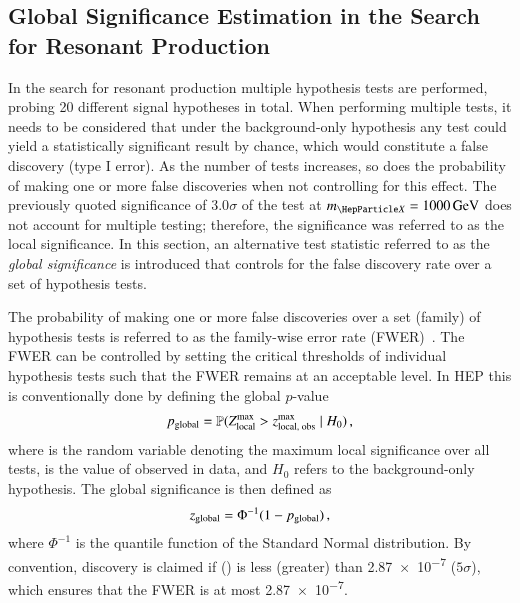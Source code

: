 
\subsection{Global Significance Estimation in the Search for Resonant \HH
  Production}%
\label{sec:global_significance}

In the search for resonant \HH production multiple hypothesis tests are
performed, probing 20 different signal hypotheses in total. When performing
multiple tests, it needs to be considered that under the background-only
hypothesis any test could yield a statistically significant result by chance,
which would constitute a false discovery (type I error). As the number of tests
increases, so does the probability of making one or more false discoveries when
not controlling for this effect. The previously quoted significance of
$3.0\sigma$ of the test at $\mX = \SI{1000}{\GeV}$ does not account for multiple
testing; therefore, the significance was referred to as the local
significance. In this section, an alternative test statistic referred to as the
\emph{global significance} is introduced that controls for the false discovery
rate over a set of hypothesis tests.

The probability of making one or more false discoveries over a set (family) of
hypothesis tests is referred to as the family-wise error rate
(FWER)~\cite{lehmann2005testing}. The FWER can be controlled by setting the
critical thresholds of individual hypothesis tests such that the FWER remains at
an acceptable level. In HEP this is conventionally done by defining the global
$p$-value
\begin{align*}
  p_{\text{global}} = \mathbb{P}( Z_{\text{local}}^{\text{max}} > z_{\text{local, obs}}^{\text{max}} \mid H_0 )\,\text{,}
\end{align*}
where \Zmaxlocal is the random variable denoting the maximum local significance
over all tests, \zmaxlocalobs is the value of \Zmaxlocal observed in data, and
$H_0$ refers to the background-only hypothesis. The global significance is then
defined as
\begin{align*}
  z_{\text{global}} = \Phi^{-1}(1 - p_{\text{global}}) \,\text{,}
\end{align*}
where $\Phi^{-1}$ is the quantile function of the Standard Normal
distribution. By convention, discovery is claimed if \pglobal (\zglobal) is less
(greater) than \num{2.87e-7} ($5\sigma$), which ensures that the FWER is at most
\num{2.87e-7}.

